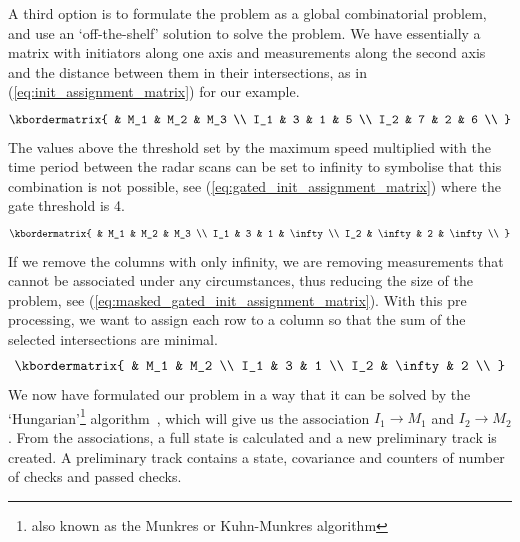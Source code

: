 A third option is to formulate the problem as a global combinatorial problem, and use an `off-the-shelf' solution to solve the problem. We have essentially a matrix with initiators along one axis and measurements along the second axis and the distance between them in their intersections, as in (\ref{eq:init_assignment_matrix}) for our example.
\begin{equation}\label{eq:init_assignment_matrix}
\kbordermatrix{
	 	& M_1 	& M_2 	& M_3	\\
    I_1 & 3 	& 1 	& 5 	\\
    I_2 & 7 	& 2 	& 6		\\
}
\end{equation}
The values above the threshold set by the maximum speed multiplied with the time period between the radar scans can be set to infinity to symbolise that this combination is not possible, see (\ref{eq:gated_init_assignment_matrix}) where the gate threshold is 4.
\begin{equation}\label{eq:gated_init_assignment_matrix}
\kbordermatrix{
	 	& M_1 		& M_2 	& M_3		\\
    I_1 & 3 		& 1 	& \infty 	\\
    I_2 & \infty 	& 2 	& \infty	\\
}
\end{equation}
If we remove the columns with only infinity, we are removing measurements that cannot be associated under any circumstances, thus reducing the size of the problem, see (\ref{eq:masked_gated_init_assignment_matrix}). With this pre processing, we want to assign each row to a column so that the sum of the selected intersections are minimal. 
\begin{equation}\label{eq:masked_gated_init_assignment_matrix}
\kbordermatrix{
	 	& M_1 		& M_2	\\
    I_1 & 3 		& 1  	\\ 
    I_2 & \infty 	& 2 	\\
}
\end{equation}
We now have formulated our problem in a way that it can be solved by the `Hungarian'\footnote{also known as the Munkres or Kuhn-Munkres algorithm} algorithm~\cite{Munkres1957}, which will give us the association \(I_1 \rightarrow M_1\) and \(I_2 \rightarrow M_2\). From the associations, a full state is calculated and a new preliminary track is created. A preliminary track contains a state, covariance and counters of number of checks and passed checks.

